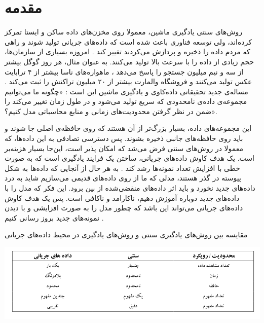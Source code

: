 
\chapter{مقدمه}
\thispagestyle{empty}
روش‌های سنتی یادگیری ماشین، معمولا روی مخزن‌های داده‌ ساکن و ایستا تمرکز کرده‌اند، ولی توسعه فناوری باعث شده است که داده‌های جریانی تولید شوند و راهی که مردم داده را ذخیره و پردازش می‌کردند تغییر کند\cite{leskovec2014mining}
. امروزه بسیاری از سازمان‌ها، حجم زیادی از داده را با سرعت بالا تولید می‌کنند. به عنوان مثال، هر روز گوگل بیشتر از سه و نیم میلیون جستجو را پاسخ می‌دهد
، ماهواره‌های ناسا بیشتر از ۴ ترابایت عکس تولید می‌کنند
 و فروشگاه والمارت بیشتر از ۲۰ میلیون تراکنش را ثبت می‌کند
. مساله‌ی جدید تحقیقاتی داده‌کاوی و یادگیری ماشین این است\cite{Nguyen2015}
: «چگونه ما می‌توانیم مجموعه‌ی داده‌ی نامحدودی که سریع تولید می‌شود و در طول زمان تغییر می‌کند را ضمن در نظر گرفتن محدودیت‌های زمانی و منابع محاسباتی مدل کنیم؟».

این مجموعه‌های داده، بسیار بزرگ‌تر از آن هستند که روی حافظه‌ی اصلی جا شوند و باید روی حافظه‌های جانبی ذخیره بشوند. پس دسترسی تصادفی به این‌ داده‌ها، که معمولا در روش‌های سنتی فرض می‌شد که امکان پذیر است، این‌جا بسیار هزینه‌بر است. یک هدف کاوش داده‌های جریانی، ساختن یک فرایند یادگیری است که به صورت خطی با افزایش تعداد نمونه‌ها رشد کند\cite{aggarwal2009data}
. به هر حال از آنجایی که داده‌ها به شکل پیوسته در گذر هستند، مدلی که ما از روی داده‌های قدیمی می‌سازیم شاید به درد داده‌های جدید نخورد و باید اثر داده‌های منقضی‌شده از بین برود. این فکر که مدل را با داده‌های جدید دوباره آموزش دهیم، ناکارامد و ناکافی است. پس یک هدف کاوش داده‌های جریانی می‌تواند این باشد که چطور مدل را به صورت افزایشی و با دیدن نمونه‌های جدید بروز رسانی کنیم\cite{Nguyen2015}
.

\begin{table}
  \caption{مقایسه بین روش‌های یادگیری سنتی و روش‌های یادگیری در محیط داده‌های جریانی\cite{Nguyen2015}}
  \label{tbl:bound}
  \includegraphics[width=\linewidth]{bound}
\end{table}

